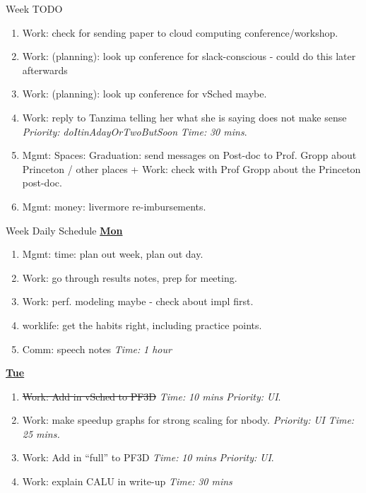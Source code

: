 \documentclass[serif, mathserif, final]{beamer}
\newcommand{\doneTask}[1]{\item \sout{#1}}
\newcommand{\timeEst}[1]{\textit{Time:} \textit{#1}}
\newcommand{\priority}[1]{\textit{Priority:} \textit{#1}}
\begin{document}
\begin{frame}{}
\begin{columns}
\begin{column}{0.50\linewidth}
\begin{block}{ Week TODO}
\begin{enumerate}
\item \tiny Work: check for sending paper to cloud computing conference/workshop. 
\item \tiny Work: (planning): look up conference for slack-conscious  - could do this later afterwards
\item \tiny Work: (planning): look up conference for vSched maybe. 
\item \tiny Work: reply to Tanzima telling her what she is saying does
  not make sense \priority{doItinAdayOrTwoButSoon} \timeEst{30 mins}.
\item \tiny Mgmt: Spaces: Graduation: send messages on Post-doc to
  Prof. Gropp about Princeton / other places + Work: check with Prof
  Gropp about the Princeton post-doc. 
\item \tiny Mgmt: money: livermore re-imbursements. 
\end{enumerate}
\end{block} 


\begin{block}{Week Daily Schedule} 
\textbf{\small \underline{Mon}}
\begin{enumerate} 
\item \tiny Mgmt: time: plan out week, plan out day.  
\item  \tiny Work: go through results notes, prep for meeting. 
\item \tiny Work: perf. modeling maybe - check about impl first. 
\item \tiny worklife: get the habits right, including practice points. 

\item \tiny Comm: speech notes \timeEst{1 hour} 
\end{enumerate} 

\textbf{\small \underline{Tue}}
\begin{enumerate} 

\tiny \doneTask{Work: Add in vSched to PF3D} \timeEst{10 mins} \priority{UI}.  
\item \tiny Work: make speedup graphs for strong scaling for nbody. \priority{UI} \timeEst{25 mins.} 

\item \tiny Work: Add in ``full'' to PF3D \timeEst{10 mins} \priority{UI}. 
\item \tiny Work: explain CALU in write-up \timeEst{30 mins} 


\end{enumerate}
\end{block}
\end{column}
\end{columns}
\end{frame}
\end{document}
